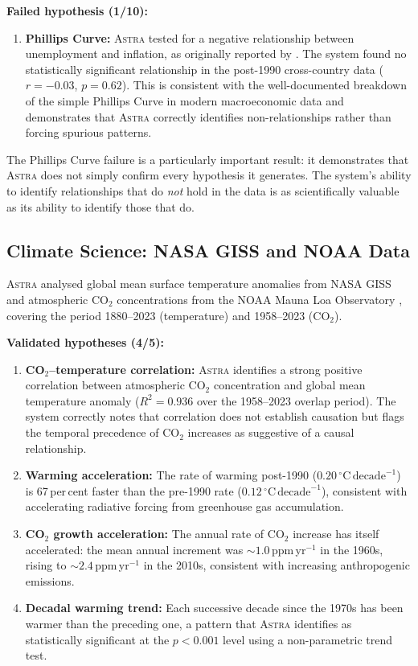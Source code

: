 \documentclass[usenatbib]{rasti}
\newcommand{\astra}{\textsc{Astra}\xspace}
\begin{document}
\textbf{Failed hypothesis (1/10):}
\begin{enumerate}
  \item[(x)] \textbf{Phillips Curve:} \astra tested for a negative relationship between unemployment and inflation, as originally reported by \citet{Phillips1958}. The system found no statistically significant relationship in the post-1990 cross-country data ($r = -0.03$, $p = 0.62$). This is consistent with the well-documented breakdown of the simple Phillips Curve in modern macroeconomic data and demonstrates that \astra correctly identifies non-relationships rather than forcing spurious patterns.
\end{enumerate}

The Phillips Curve failure is a particularly important result: it demonstrates that \astra does not simply confirm every hypothesis it generates. The system's ability to identify relationships that do \emph{not} hold in the data is as scientifically valuable as its ability to identify those that do.

\subsection{Climate Science: NASA GISS and NOAA Data}
\label{sec:crossdomain:climate}

\astra analysed global mean surface temperature anomalies from NASA GISS \citep{Hansen2010} and atmospheric CO$_{2}$ concentrations from the NOAA Mauna Loa Observatory \citep{NOAA2024}, covering the period 1880--2023 (temperature) and 1958--2023 (CO$_{2}$).

\textbf{Validated hypotheses (4/5):}
\begin{enumerate}
  \item[(i)] \textbf{CO$_{2}$--temperature correlation:} \astra identifies a strong positive correlation between atmospheric CO$_{2}$ concentration and global mean temperature anomaly ($R^{2} = 0.936$ over the 1958--2023 overlap period). The system correctly notes that correlation does not establish causation but flags the temporal precedence of CO$_{2}$ increases as suggestive of a causal relationship.
  \item[(ii)] \textbf{Warming acceleration:} The rate of warming post-1990 ($0.20\,^{\circ}\mathrm{C}\,\mathrm{decade}^{-1}$) is 67\,per\,cent faster than the pre-1990 rate ($0.12\,^{\circ}\mathrm{C}\,\mathrm{decade}^{-1}$), consistent with accelerating radiative forcing from greenhouse gas accumulation.
  \item[(iii)] \textbf{CO$_{2}$ growth acceleration:} The annual rate of CO$_{2}$ increase has itself accelerated: the mean annual increment was ${\sim}1.0$\,ppm\,yr$^{-1}$ in the 1960s, rising to ${\sim}2.4$\,ppm\,yr$^{-1}$ in the 2010s, consistent with increasing anthropogenic emissions.
  \item[(iv)] \textbf{Decadal warming trend:} Each successive decade since the 1970s has been warmer than the preceding one, a pattern that \astra identifies as statistically significant at the $p < 0.001$ level using a non-parametric trend test.
\end{enumerate}
\end{document}
